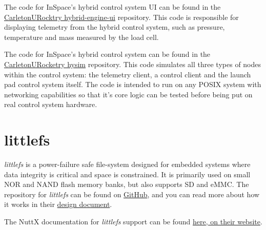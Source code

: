 The code for InSpace's hybrid control system UI can be found in the
\href{https://github.com/CarletonURocketry/hybrid-engine-ui}{CarletonURocktry hybrid-engine-ui} repository. This code
is responsible for displaying telemetry from the hybrid control system, such as pressure, temperature and mass measured
by the load cell.

The code for InSpace's hybrid control system can be found in the
\href{https://github.com/CarletonURocketry/hysim}{CarletonURocketry hysim} repository. This code simulates all three
types of nodes within the control system: the telemetry client, a control client and the launch pad control system
itself. The code is intended to run on any POSIX system with networking capabilities so that it's core logic can be
tested before being put on real control system hardware.

\section{littlefs} \label{apx:littlefs}

\textit{littlefs} is a power-failure safe file-system designed for embedded systems where data integrity is critical and
space is constrained. It is primarily used on small NOR and NAND flash memory banks, but also supports SD and eMMC. The
repository for \textit{littlefs} can be found on \href{https://github.com/littlefs-project/littlefs}{GitHub}, and you can read more about how it works in their
\href{https://github.com/littlefs-project/littlefs/blob/master/DESIGN.md}{design document}.

The NuttX documentation for \textit{littlefs} support can be found
\href{https://nuttx.apache.org/docs/latest/components/filesystem/littlefs.html}{here, on their website}.
